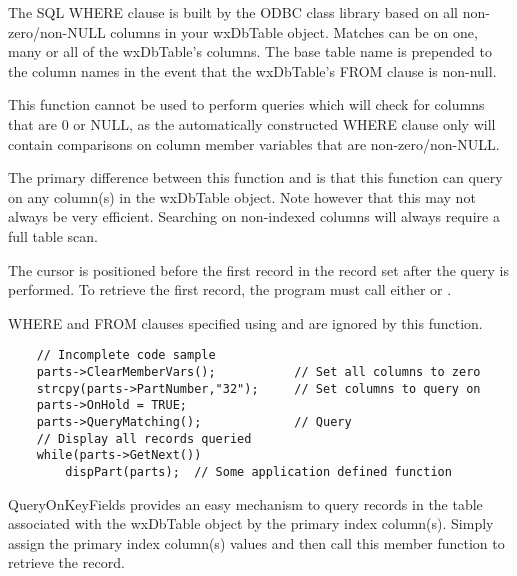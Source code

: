 
The SQL WHERE clause is built by the ODBC class library based on all 
non-zero/non-NULL columns in your wxDbTable object.  Matches can be on one, 
many or all of the wxDbTable's columns.  The base table name is prepended 
to the column names in the event that the wxDbTable's FROM clause is non-null.

This function cannot be used to perform queries which will check for 
columns that are 0 or NULL, as the automatically constructed WHERE clause 
only will contain comparisons on column member variables that are 
non-zero/non-NULL.

The primary difference between this function and  
is that this function can query on any column(s) in the wxDbTable object.  
Note however that this may not always be very efficient.  Searching on 
non-indexed columns will always require a full table scan.

The cursor is positioned before the first record in the record set after 
the query is performed.  To retrieve the first record, the program must call 
either  or 
.

WHERE and FROM clauses specified using  
and  are ignored by 
this function.


\begin{verbatim}
    // Incomplete code sample
    parts->ClearMemberVars();           // Set all columns to zero
    strcpy(parts->PartNumber,"32");     // Set columns to query on
    parts->OnHold = TRUE;
    parts->QueryMatching();             // Query
    // Display all records queried
    while(parts->GetNext())
        dispPart(parts);  // Some application defined function
\end{verbatim}


\label{wxdbtablequeryonkeyfields}


QueryOnKeyFields provides an easy mechanism to query records in the table 
associated with the wxDbTable object by the primary index column(s).  Simply 
assign the primary index column(s) values and then call this member function 
to retrieve the record.  

